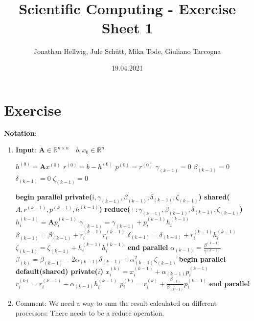 \documentclass{article}
\title{Scientific Computing - Exercise Sheet 1}
\author{Jonathan Hellwig, Jule Schütt, Mika Tode, Giuliano Taccogna}
\date{19.04.2021}
\begin{document}
\maketitle

\section{Exercise}
\textbf{Notation}:
\begin{enumerate}[label=(\alph*)]
  \item \textbf{Input}: $ \textbf{A} \in \mathbb{R}^{n\times n} \quad b, x_0\in \mathbb{R}^n$
    \begin{algorithmic}[1]
      \State $h^{(0)} = \textbf{A}x^{(0)}$
      \State $r^{(0)} = b - h^{(0)}$
      \State $p^{(0)} = r^{(0)}$
      \EndFor
      \State $\gamma_{(k-1)} = 0$ 
      \State $\beta_{(k-1)} = 0$
      \State $\delta_{(k-1)} = 0$
      \State $\zeta_{(k-1)} = 0$

      \State \textbf{begin parallel private($i,\gamma_{(k-1)}, \beta_{(k-1)}, \delta_{(k-1)}, \zeta_{(k-1)}$) shared($A,r^{(k-1)},p^{(k-1)},h^{(k-1)}$)}
    \State \textbf{reduce($+:\gamma_{(k-1)}, \beta_{(k-1)}, \delta_{(k-1)}, \zeta_{(k-1)}$)}
      \State $h_i^{(k-1)} = \textbf{A}p_i^{(k-1)}$
      \State $\gamma_{(k-1)} = \gamma_{(k-1)} + p_i^{(k-1)} h_i^{(k-1)}$
      \State $\beta_{(k-1)} = \beta_{(k-1)} + r_i^{(k-1)} r_i^{(k-1)}$
      \State $\delta_{(k-1)} = \delta_{(k-1)} + r_i^{(k-1)} h_i^{(k-1)}$
      \State $\zeta_{(k-1)} = \zeta_{(k-1)} + h_i^{(k-1)} h_i^{(k-1)}$
      \EndFor
      \State \textbf{end parallel}
      \State $\alpha_{(k-1)} = \frac{\beta^{(k-1)}}{\gamma^{(k-1)}}$
      \State $\beta_{(k)} = \beta_{(k-1)} - 2 \alpha_{(k-1)} \delta_{(k-1)} + \alpha_{(k-1)}^2\zeta_{(k-1)}$
      \State \textbf{begin parallel default(shared) private($i$)}
      \State $x_i^{(k)} = x_i^{(k-1)} + \alpha_{(k-1)}p_i^{(k-1)}$
      \State $r_i^{(k)} = r_i^{(k-1)} - \alpha_{(k-1)}h_i^{(k-1)}$
      \State $p_i^{(k)} = r_i^{(k)} + \frac{\beta_{(k)}}{\beta_{(k-1)}}p_i^{(k-1)}$
      \EndFor
      \State \textbf{end parallel}
      \EndFor
    \end{algorithmic}
  \item Comment: We need a way to sum the result calculated on different processors: There needs to be a reduce operation.
\end{enumerate} 


\end{document}
